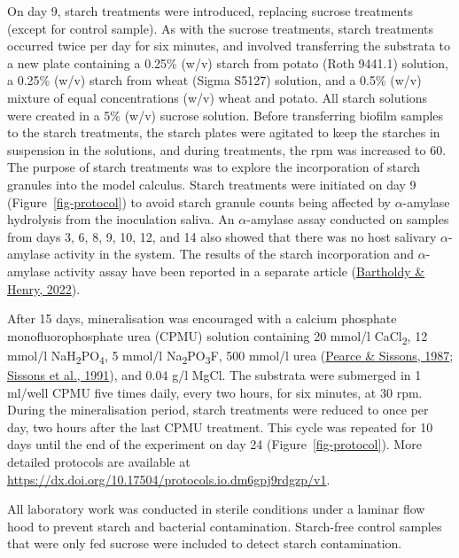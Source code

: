 \documentclass[
  letterpaper,
]{book}
\begin{document}
On day 9, starch treatments were introduced, replacing sucrose
treatments (except for control sample). As with the sucrose treatments,
starch treatments occurred twice per day for six minutes, and involved
transferring the substrata to a new plate containing a 0.25\% (w/v)
starch from potato (Roth 9441.1) solution, a 0.25\% (w/v) starch from
wheat (Sigma S5127) solution, and a 0.5\% (w/v) mixture of equal
concentrations (w/v) wheat and potato. All starch solutions were created
in a 5\% (w/v) sucrose solution. Before transferring biofilm samples to
the starch treatments, the starch plates were agitated to keep the
starches in suspension in the solutions, and during treatments, the rpm
was increased to 60. The purpose of starch treatments was to explore the
incorporation of starch granules into the model calculus. Starch
treatments were initiated on day 9 (Figure~\ref{fig-protocol}) to avoid
starch granule counts being affected by \(\alpha\)-amylase hydrolysis
from the inoculation saliva. An \(\alpha\)-amylase assay conducted on
samples from days 3, 6, 8, 9, 10, 12, and 14 also showed that there was
no host salivary \(\alpha\)-amylase activity in the system. The results
of the starch incorporation and \(\alpha\)-amylase activity assay have
been reported in a separate article
(\protect\hyperlink{ref-bartholdyInvestigatingBiases2022}{Bartholdy \&
Henry, 2022}).

After 15 days, mineralisation was encouraged with a calcium phosphate
monofluorophosphate urea (CPMU) solution containing 20 mmol/l
CaCl\textsubscript{2}, 12 mmol/l
NaH\textsubscript{2}PO\textsubscript{4}, 5 mmol/l
Na\textsubscript{2}PO\textsubscript{3}F, 500 mmol/l urea
(\protect\hyperlink{ref-pearceConcomitantDeposition1987}{Pearce \&
Sissons, 1987};
\protect\hyperlink{ref-sissonsMultistationPlaque1991}{Sissons et al.,
1991}), and 0.04 g/l MgCl. The substrata were submerged in 1 ml/well
CPMU five times daily, every two hours, for six minutes, at 30 rpm.
During the mineralisation period, starch treatments were reduced to once
per day, two hours after the last CPMU treatment. This cycle was
repeated for 10 days until the end of the experiment on day 24
(Figure~\ref{fig-protocol}). More detailed protocols are available at
\url{https://dx.doi.org/10.17504/protocols.io.dm6gpj9rdgzp/v1}.

All laboratory work was conducted in sterile conditions under a laminar
flow hood to prevent starch and bacterial contamination. Starch-free
control samples that were only fed sucrose were included to detect
starch contamination.
\end{document}
